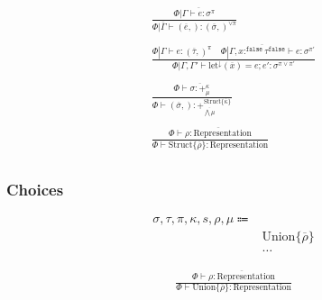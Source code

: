 \documentclass {article}
\begin{document}
\begin{gather*}
\frac
{\Phi | \overline { \Gamma \vdash e : \sigma^\pi }}
{\Phi | \overline \Gamma  \vdash (\overline e,) : (\overline \sigma,)^{\lor \pi} } \\
\\
\frac
{\Phi | \Gamma \vdash e : (\overline \tau,)^\pi \quad \Phi | \Gamma , \overline {x :^\texttt{false} \tau^\texttt{false}} \vdash e : \sigma^{\pi'}}
{\Phi | \Gamma, \Gamma' \vdash \text{let}^\downarrow (\overline x) = e; e' : \sigma^{\pi \lor \pi'}} \\
\\
\frac
{\Phi \vdash \overline {\sigma : +^{\kappa}_{\mu}}}
{\Phi \vdash (\overline \sigma,) : +^{\text{Struct} \{ \overline \kappa\}}_{\overline {\bigwedge \mu}}} \\
\\
\frac
{\Phi \vdash \overline {\rho : \text{Representation}}}
{\Phi \vdash \text{Struct} \{ \overline \rho \} : \text{Representation} } \\
\end{gather*}

\subsubsection{Choices}
\begin{align*}
\sigma, \tau, \pi, \kappa, s, \rho, \mu \Coloneqq & \\
& \text{Union} \{ \overline \rho \} \tag{Union Representation} \\
& \dots
\end{align*}

\begin{gather*}
\frac
{\Phi \vdash \overline {\rho : \text{Representation}}}
{\Phi \vdash \text{Union} \{ \overline \rho \} : \text{Representation} } \\
\end{gather*}
\end{document}
